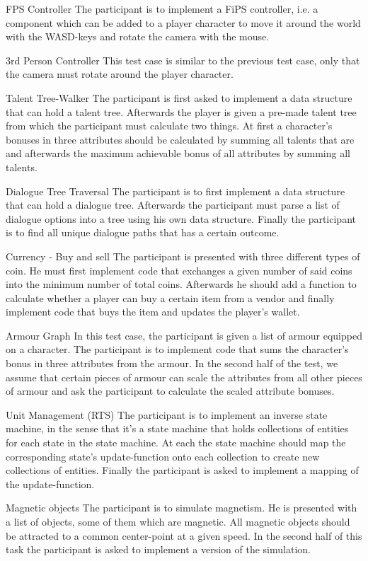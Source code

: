 \begin{labeling}{\quad\quad}
    \item[FPS Controller] The participant is to implement a \gls{FiPS} controller, i.e. a component which can be added to a player character to move it around the world with the WASD-keys and rotate the camera with the mouse.
    \item[3rd Person Controller] This test case is similar to the previous test case, only that the camera must rotate around the player character.
    \item[Talent Tree-Walker] The participant is first asked to implement a data structure that can hold a talent tree. Afterwards the player is given a pre-made talent tree from which the participant must calculate two things. At first a character's bonuses in three attributes should be calculated by summing all talents that are  and afterwards the maximum achievable bonus of all attributes by summing all talents.
    \item[Dialogue Tree Traversal] The participant is to first implement a data structure that can hold a dialogue tree. Afterwards the participant must parse a list of dialogue options into a tree using his own data structure. Finally the participant is to find all unique dialogue paths that has a certain outcome.
    \item[Currency - Buy and sell] The participant is presented with three different types of coin. He must first implement code that exchanges a given number of said coins into the minimum number of total coins. Afterwards he should add a function to calculate whether a player can buy a certain item from a vendor and finally implement code that buys the item and updates the player's wallet.
    \item[Armour Graph] In this test case, the participant is given a list of armour equipped on a character. The participant is to implement code that sums the character's bonus in three attributes from the armour. In the second half of the test, we assume that certain pieces of armour can scale the attributes from all other pieces of armour and ask the participant to calculate the scaled attribute bonuses.
    \item[Unit Management (RTS)] The participant is to implement an inverse state machine, in the sense that it's a state machine that holds collections of entities for each state in the state machine. At each  the state machine should map the corresponding state's update-function onto each collection to create new collections of entities. Finally the participant is asked to implement a  mapping of the update-function.
    \item[Magnetic objects] The participant is to simulate magnetism. He is presented with a list of objects, some of them which are magnetic. All magnetic objects should be attracted to a common center-point at a given speed. In the second half of this task the participant is asked to implement a  version of the simulation.
\end{labeling}


